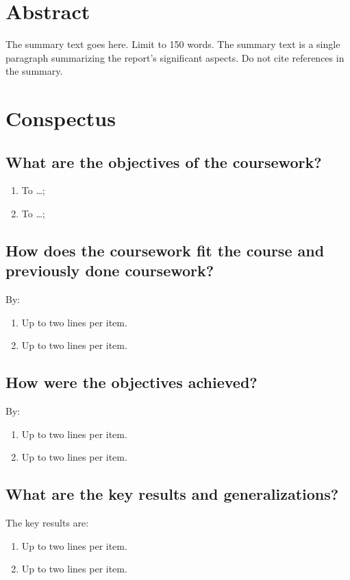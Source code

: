 \section{Abstract}
The summary text goes here. Limit to 150 words. The summary text is a single paragraph summarizing the report's significant aspects. Do not cite references in the summary.


\section{Conspectus}
\label{sec:cnspcts}

\IEEEpubidadjcol %

\subsection{What are the objectives of the coursework?}

\begin{enumerate}
\item To \ldots;
\item To \ldots;
\end{enumerate}	
	
\subsection{How does the coursework fit the course and previously done coursework?}
By:
\begin{enumerate}
\item Up to two lines per item.
\item Up to two lines per item.
\end{enumerate}	


	
\subsection{How were the objectives achieved?}
By:
\begin{enumerate}
\item Up to two lines per item.
\item Up to two lines per item.
\end{enumerate}
	
\subsection{What are the key results and generalizations?}
The key results are:
\begin{enumerate}
\item Up to two lines per item.
\item Up to two lines per item.
\end{enumerate}

